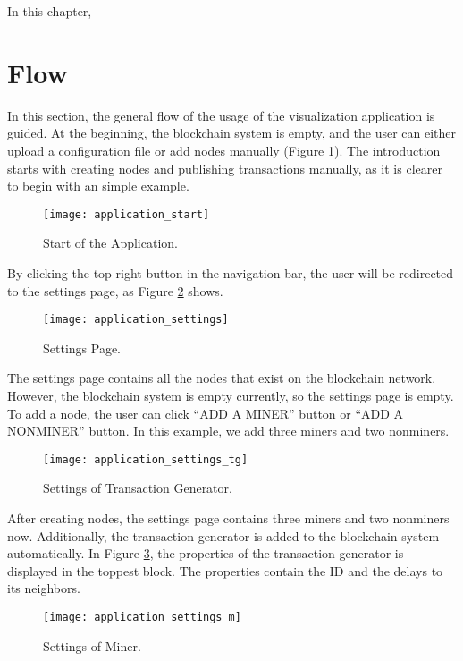In this chapter, 

\section{Flow}
\label{sec:flow}

In this section, the general flow of the usage of the visualization application is guided. At the beginning, the blockchain system is empty, and the user can either upload a configuration file or add nodes manually (Figure \ref{fig:start of the application}). The introduction starts with creating nodes and publishing transactions manually, as it is clearer to begin with an simple example.

\begin{figure}[htb]
    \centering
    \texttt{[image: application\_start]}
    \caption{Start of the Application.}
    \label{fig:start of the application}
\end{figure}

By clicking the top right button in the navigation bar, the user will be redirected to the settings page, as Figure \ref{fig:settings page} shows.

\begin{figure}[htb]
    \centering
    \texttt{[image: application\_settings]}
    \caption{Settings Page.}
    \label{fig:settings page}
\end{figure}

The settings page contains all the nodes that exist on the blockchain network. However, the blockchain system is empty currently, so the settings page is empty. To add a node, the user can click ``ADD A MINER'' button or ``ADD A NONMINER'' button. In this example, we add three miners and two nonminers.

\begin{figure}[htb]
    \centering
    \texttt{[image: application\_settings\_tg]}
    \caption{Settings of Transaction Generator.}
    \label{fig:settings of transaction generator}
\end{figure}

After creating nodes, the settings page contains three miners and two nonminers now. Additionally, the transaction generator is added to the blockchain system automatically. In Figure \ref{fig:settings of transaction generator}, the properties of the transaction generator is displayed in the toppest block. The properties contain the ID and the delays to its neighbors.

\begin{figure}[htb]
    \centering
    \texttt{[image: application\_settings\_m]}
    \caption{Settings of Miner.}
    \label{fig:settings of miner}
\end{figure}

